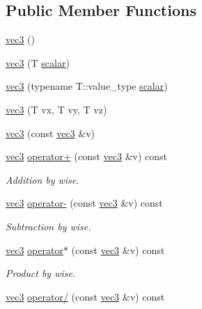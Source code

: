\subsection*{Public Member Functions}
\begin{DoxyCompactItemize}
\item 
\mbox{\hyperlink{struct_space_h_1_1vec3_adaeadb1aa964e9f603d2d2402bc0e29a}{vec3}} ()
\item 
\mbox{\hyperlink{struct_space_h_1_1vec3_a642fe9876e4a929a13b859e0941a5a77}{vec3}} (T \mbox{\hyperlink{main_8cpp_af786f233400a63a2d45bfcb709ffbfb3}{scalar}})
\item 
\mbox{\hyperlink{struct_space_h_1_1vec3_ac718d5c1fa131b4a3dafbf8fe709a73a}{vec3}} (typename T\+::value\+\_\+type \mbox{\hyperlink{main_8cpp_af786f233400a63a2d45bfcb709ffbfb3}{scalar}})
\item 
\mbox{\hyperlink{struct_space_h_1_1vec3_a9441fda82b87e8b91167dc6e5e3039a2}{vec3}} (T vx, T vy, T vz)
\item 
\mbox{\hyperlink{struct_space_h_1_1vec3_ae3f72473af782f642108ed5c87263657}{vec3}} (const \mbox{\hyperlink{struct_space_h_1_1vec3}{vec3}} \&v)
\item 
\mbox{\hyperlink{struct_space_h_1_1vec3}{vec3}} \mbox{\hyperlink{struct_space_h_1_1vec3_a439dd37afaf3c046cd58b370b9d70b80}{operator+}} (const \mbox{\hyperlink{struct_space_h_1_1vec3}{vec3}} \&v) const
\begin{DoxyCompactList}\small\item\em Addition by wise. \end{DoxyCompactList}\item 
\mbox{\hyperlink{struct_space_h_1_1vec3}{vec3}} \mbox{\hyperlink{struct_space_h_1_1vec3_a8af5f368ccbf70d24d528592acfc6278}{operator-\/}} (const \mbox{\hyperlink{struct_space_h_1_1vec3}{vec3}} \&v) const
\begin{DoxyCompactList}\small\item\em Subtraction by wise. \end{DoxyCompactList}\item 
\mbox{\hyperlink{struct_space_h_1_1vec3}{vec3}} \mbox{\hyperlink{struct_space_h_1_1vec3_a5399298171d5e12e7b76ade00ab7d67d}{operator$\ast$}} (const \mbox{\hyperlink{struct_space_h_1_1vec3}{vec3}} \&v) const
\begin{DoxyCompactList}\small\item\em Product by wise. \end{DoxyCompactList}\item 
\mbox{\hyperlink{struct_space_h_1_1vec3}{vec3}} \mbox{\hyperlink{struct_space_h_1_1vec3_ab9d46a10bb578ff6939ed9280cb12df8}{operator/}} (const \mbox{\hyperlink{struct_space_h_1_1vec3}{vec3}} \&v) const

\end{DoxyCompactItemize}
